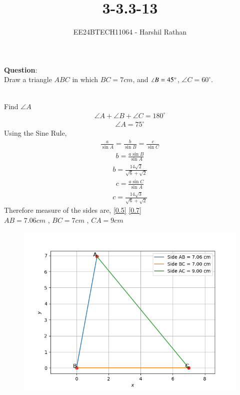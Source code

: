 \documentclass[journal]{IEEEtran}
\begin{document}

\vspace{3cm}

\title{3-3.3-13}
\author{EE24BTECH11064 - Harshil Rathan}
{\let\newpage\relax\maketitle}

\renewcommand{\thefigure}{\theenumi}
\renewcommand{\thetable}{\theenumi}
\setlength{\intextsep}{10pt} %


\renewcommand{\thetable}{\theenumi}
\textbf{Question}:\\
Draw a triangle $ABC$ in which $BC = 7cm$, and $\angle B = 45\degree$, $\angle{C}=60^\circ$.\\
\solution \\
\begin{table}[h!]
    \centering
    
\end{table}
Find $\angle{A}$
\begin{align}
     \angle{A}+\angle{B}+\angle{C}=180^\circ 
\end{align}    
\begin{align}    
     \angle{A}=75^\circ
\end{align}
Using the Sine Rule,
\begin{align}
    \frac{a}{\sin{A}}=\frac{b}{\sin{B}}=\frac{c}{\sin{C}}
    \label{0.3}
\end{align}
\begin{align}
    b=\frac{a \sin B}{\sin A} 
\end{align}
\begin{align}
    b=\frac{14\sqrt{2}}{\sqrt{6}+\sqrt{2}}
    \label{0.5}
\end{align}
\begin{align}
    c=\frac{a \sin C}{\sin A}
\end{align}
\begin{align}
      c= \frac{14\sqrt3}{\sqrt6+\sqrt2}
      \label{0.7}
\end{align}
Therefore measure of the sides are, \ref{0.5} \ref{0.7} \\
$AB=7.06cm$ , $BC=7cm$ , $CA=9cm$
\begin{figure}[!ht]
   \centering
   \includegraphics[width=\linewidth]{figs/Figure_1.png}
   \caption{}
   \label{stemplot}
\end{figure}
\end{document}
